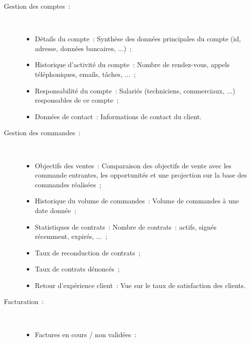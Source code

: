     \begin{description}
        \item[Gestion des comptes~:] ~ \\
            \begin{itemize}
                \item Détails du compte~: Synthèse des données principales du compte (id, adresse, données bancaires, ...)~;
                \item Historique d'activité du compte~: Nombre de rendez-vous, appels téléphoniques, emails, tâches, ...~;
                \item Responsabilité du compte~: Salariés (techniciens, commerciaux, ...) responsables de ce compte~;
                \item Données de contact~: Informations de contact du client.
            \end{itemize}

        \item[Gestion des commandes~:] ~ \\
            \begin{itemize}
                \item Objectifs des ventes~: Comparaison des objectifs de vente avec les commande entrantes, les opportunités et une projection sur la base des commandes réalisées~;
                \item Historique du volume de commandes~: Volume de commandes à une date donnée~;
                \item Statistiques de contrats~: Nombre de contrats~: actifs, signés récemment, expirés, ...~;
                \item Taux de reconduction de contrats~;
                \item Taux de contrats dénoncés~;
                \item Retour d'expérience client~: Vue sur le taux de satisfaction des clients.
            \end{itemize}

        \item[Facturation~:] ~ \\
            \begin{itemize}
                \item Factures en cours / non validées~:
            \end{itemize}

    \end{description}



